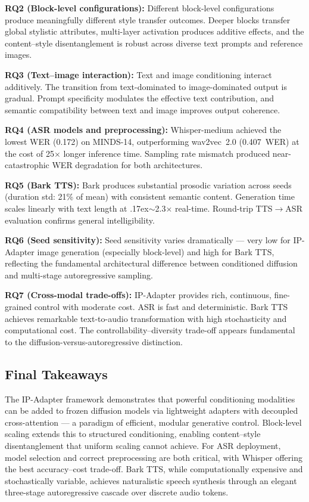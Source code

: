 \documentclass[conference]{IEEEtran}
\newcommand{\ipadapter}{IP-Adapter}
\begin{document}
\textbf{RQ2 (Block-level configurations):} Different block-level configurations produce meaningfully different style transfer outcomes. Deeper blocks transfer global stylistic attributes, multi-layer activation produces additive effects, and the content--style disentanglement is robust across diverse text prompts and reference images.

\textbf{RQ3 (Text--image interaction):} Text and image conditioning interact additively. The transition from text-dominated to image-dominated output is gradual. Prompt specificity modulates the effective text contribution, and semantic compatibility between text and image improves output coherence.

\textbf{RQ4 (ASR models and preprocessing):} Whisper-medium achieved the lowest WER (0.172) on MINDS-14, outperforming wav2vec~2.0 (0.407~WER) at the cost of 25$\times$ longer inference time. Sampling rate mismatch produced near-catastrophic WER degradation for both architectures.

\textbf{RQ5 (Bark TTS):} Bark produces substantial prosodic variation across seeds (duration std: 21\% of mean) with consistent semantic content. Generation time scales linearly with text length at {\raise.17ex\hbox{$\scriptstyle\sim$}}2.3$\times$ real-time. Round-trip TTS$\to$ASR evaluation confirms general intelligibility.

\textbf{RQ6 (Seed sensitivity):} Seed sensitivity varies dramatically --- very low for \ipadapter{} image generation (especially block-level) and high for Bark TTS, reflecting the fundamental architectural difference between conditioned diffusion and multi-stage autoregressive sampling.

\textbf{RQ7 (Cross-modal trade-offs):} \ipadapter{} provides rich, continuous, fine-grained control with moderate cost. ASR is fast and deterministic. Bark TTS achieves remarkable text-to-audio transformation with high stochasticity and computational cost. The controllability--diversity trade-off appears fundamental to the diffusion-versus-autoregressive distinction.

\subsection{Final Takeaways}

The \ipadapter{} framework demonstrates that powerful conditioning modalities can be added to frozen diffusion models via lightweight adapters with decoupled cross-attention --- a paradigm of efficient, modular generative control. Block-level scaling extends this to structured conditioning, enabling content--style disentanglement that uniform scaling cannot achieve. For ASR deployment, model selection and correct preprocessing are both critical, with Whisper offering the best accuracy--cost trade-off. Bark TTS, while computationally expensive and stochastically variable, achieves naturalistic speech synthesis through an elegant three-stage autoregressive cascade over discrete audio tokens.
\end{document}
